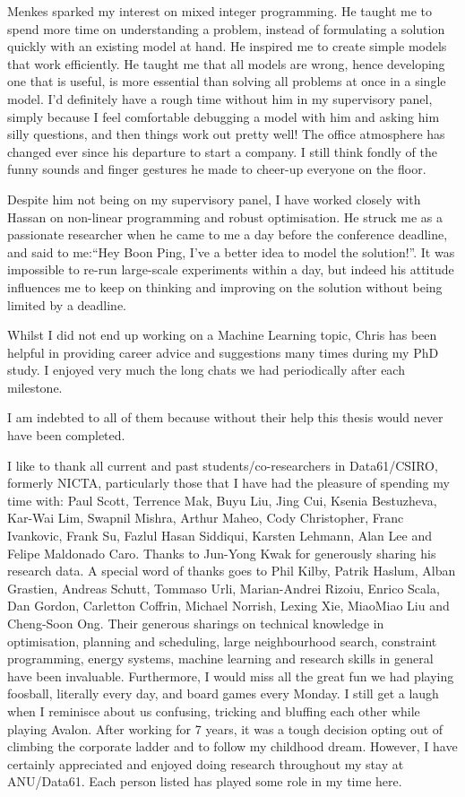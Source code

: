 Menkes sparked my interest on mixed integer programming. 
He taught me to spend more time on understanding a problem, instead of formulating a solution quickly with an existing model at hand. 
He inspired me to create simple models that work efficiently. He taught me that all models are wrong, hence developing one that is useful, is more essential than solving all problems at once in a single model.
I'd definitely have a rough time without him in my supervisory panel, simply because I feel comfortable debugging a model with him and asking him silly questions, and then things work out pretty well! 
The office atmosphere has changed ever since his departure to start a company. I still think fondly of the funny sounds and finger gestures he made to cheer-up everyone on the floor. 

Despite him not being on my supervisory panel, I have worked closely with Hassan on non-linear programming and robust optimisation. He struck me as a passionate researcher when he came to me a day before the conference deadline, and said to me:``Hey Boon Ping, I've a better idea to model the solution!''. It was impossible to re-run large-scale experiments within a day, but indeed his attitude influences me to keep on thinking and improving on the solution without being limited by a deadline. 

Whilst I did not end up working on a Machine Learning topic, Chris has been helpful in providing career advice and suggestions many times during my PhD study. I enjoyed very much the long chats we had periodically after each milestone.

I am indebted to all of them because without their help this thesis would never have been completed.

I like to thank all current and past students/co-researchers in Data61/CSIRO, formerly NICTA, particularly those that I have had the pleasure of spending my time with: Paul Scott, Terrence Mak, Buyu Liu, Jing Cui, Ksenia Bestuzheva, Kar-Wai Lim, Swapnil Mishra, Arthur Maheo, Cody Christopher, Franc Ivankovic, Frank Su, Fazlul Hasan Siddiqui, Karsten Lehmann, Alan Lee and Felipe Maldonado Caro. Thanks to Jun-Yong Kwak for generously sharing his research data. A special word of thanks goes to Phil Kilby, Patrik Haslum, Alban Grastien, Andreas Schutt, Tommaso Urli, Marian-Andrei Rizoiu, Enrico Scala, Dan Gordon, Carletton Coffrin, Michael Norrish, Lexing Xie, MiaoMiao Liu and Cheng-Soon Ong. Their generous sharings on technical knowledge in optimisation, planning and scheduling, large neighbourhood search, constraint programming, energy systems, machine learning and research skills in general have been invaluable. Furthermore, I would miss all the great fun we had playing foosball, literally every day, and board games every Monday. I still get a laugh when I reminisce about us confusing, tricking and bluffing each other while playing Avalon. After working for 7 years, it was a tough decision opting out of climbing the corporate ladder and to follow my childhood dream. However, I have certainly appreciated and enjoyed doing research throughout my stay at ANU/Data61. Each person listed has played some role in my time here. 

